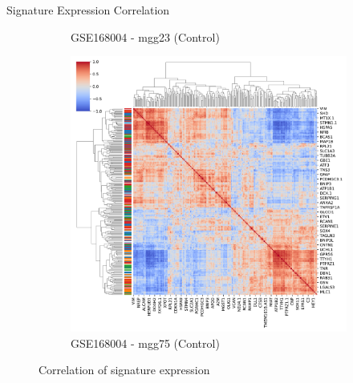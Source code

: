 \documentclass[aspectratio=169,9pt]{beamer}
\begin{document}
\begin{frame}{Signature Expression Correlation}
\begin{adjustwidth}{-5cm}{-5cm}
\begin{figure}
\begin{subfigure}[b]{0.38\textwidth}
                    \caption{GSE168004 - mgg23 (Control)}
                \end{subfigure}
                \begin{subfigure}[b]{0.38\textwidth}
                    \centering
                    \includegraphics[width=\textwidth]{mgg75_Corrplot_coloured}
                    \caption{GSE168004 - mgg75 (Control)}
                \end{subfigure}
                \caption{Correlation of signature expression}
            \end{figure}
        \end{adjustwidth}
    \end{frame}
\end{document}
